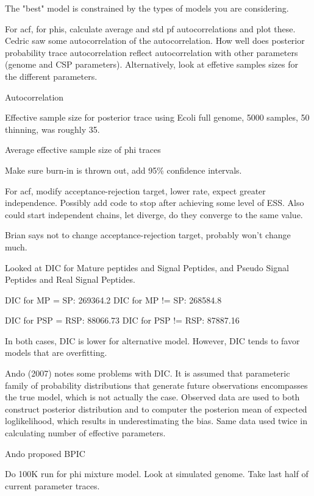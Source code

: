 \documentclass[11pt]{labbook}
\begin{document}
The "best" model is constrained by the types of models you are considering. 

 
 
For acf, for phis, calculate average and std pf autocorrelations and plot these. Cedric saw some autocorrelation of the autocorrelation. How well does posterior probability trace autocorrelation reflect autocorrelation with other parameters (genome and CSP parameters). Alternatively, look at effetive samples sizes for the different parameters. 

Autocorrelation

Effective sample size for posterior trace using Ecoli full genome, 5000 samples, 50 thinning, was roughly 35. 

Average effective sample size of phi traces 

Make sure burn-in is thrown out, add 95\% confidence intervals.


For acf, modify acceptance-rejection target, lower rate, expect greater independence. Possibly add code to stop after achieving some level of ESS. Also could start independent chains, let diverge, do they converge to the same value. 

Brian says not to change acceptance-rejection target, probably won't change much.


Looked at DIC for Mature peptides and Signal Peptides, and Pseudo Signal Peptides and Real Signal Peptides.

DIC for MP = SP: 269364.2
DIC for MP != SP: 268584.8

DIC for PSP = RSP: 88066.73
DIC for PSP != RSP: 87887.16

In both cases, DIC is lower for alternative model. However, DIC tends to favor models that are overfitting.

Ando (2007) notes some problems with DIC. It is assumed that parameteric family of probability distributions that generate future observations encompasses the true model, which is not actually the case. Observed data are used to both construct posterior distribution and to computer the posterion mean of expected loglikelihood, which results in underestimating the bias. Same data used twice in calculating number of effective parameters.

Ando proposed BPIC

Do 100K run for phi mixture model. Look at simulated genome. Take last half of current parameter traces.
\end{document}
